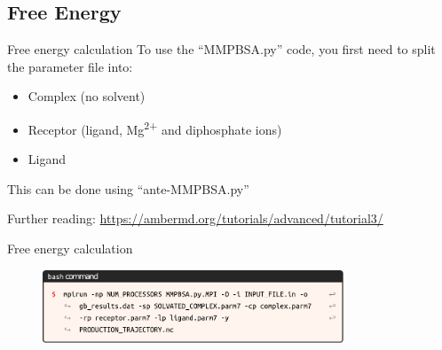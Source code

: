 \subsection{Free Energy}
\begin{frame}{Free energy calculation}
To use the \enquote{MMPBSA.py} code, you first need to split the parameter file into:
\begin{itemize}
	\item Complex (no solvent)
	\item Receptor (ligand, Mg\textsuperscript{2+} and diphosphate ions)
	\item Ligand
\end{itemize}
\vspace{3cm}
This can be done using \enquote{ante-MMPBSA.py}

{\tiny Further reading: \href{https://ambermd.org/tutorials/advanced/tutorial3/}{https://ambermd.org/tutorials/advanced/tutorial3/}}
\end{frame}

\begin{frame}{Free energy calculation}
\begin{figure}
\centering
\includegraphics[width=0.8\textwidth]{figures/dynamics/gbsa.pdf}
\end{figure}
\end{frame}
